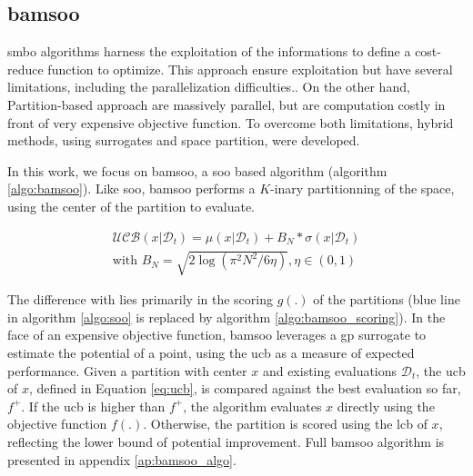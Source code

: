 \subsection{\acrfull{bamsoo}}
\label{sec:bamsoo}

\acrfull{smbo} algorithms harness the exploitation of the informations to define a cost-reduce function to optimize. This approach ensure exploitation but have several limitations, including the parallelization difficulties.. On the other hand, Partition-based approach are massively parallel, but are computation costly in front of very expensive objective function. To overcome both limitations, hybrid methods, using surrogates and space partition, were developed.

In this work, we focus on \acrshort{bamsoo}\cite{wang_bayesian_2014}, a \acrshort{soo} based algorithm (algorithm \ref{algo:bamsoo}). Like \acrshort{soo}, \acrshort{bamsoo} performs a $K$-inary partitionning of the space, using the center of the partition to evaluate. 

\begin{equation}
    \begin{split}
    \mathcal{UCB}(x| \mathcal D_t) = \mu(x|\mathcal D_t) +  B_N * \sigma(x|\mathcal D_t) 
    \\ \text{with } B_N = \sqrt{2 \log (\pi^2 N^2/6 \eta)} , \eta \in (0,1)      
    \end{split}  
    \label{eq:ucb}
\end{equation}

The difference with lies primarily in the scoring $g(.)$ of the partitions (blue line in algorithm \ref{algo:soo} is replaced by algorithm \ref{algo:bamsoo_scoring}). In the face of an expensive objective function, \acrshort{bamsoo} leverages a \acrshort{gp} surrogate to estimate the potential of a point, using the \acrshort{ucb} as a measure of expected performance. Given a partition with center $x$ and existing evaluations $\mathcal{D}_t$, the \acrshort{ucb} of $x$, defined in Equation \ref{eq:ucb}, is compared against the best evaluation so far, $f^+$. If the \acrshort{ucb} is higher than $f^+$, the algorithm evaluates $x$ directly using the objective function $f(.)$. Otherwise, the partition is scored using the \acrshort{lcb} of $x$, reflecting the lower bound of potential improvement. Full \acrshort{bamsoo} algorithm is presented in appendix \ref{ap:bamsoo_algo}.


